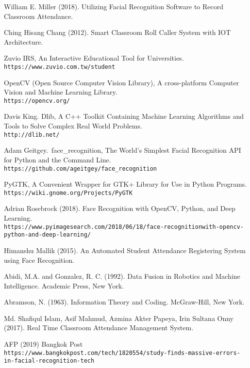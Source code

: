 \begin{thebibliography}{10}

  William E. Miller (2018).
  Utilizing Facial Recognition Software to Record Classroom Attendance.

  Ching Hisang Chang (2012).
  Smart Classroom Roll Caller System with IOT Architecture.

  Zuvio IRS,
  An Interactive Educational Tool for Universities.
  \\\texttt{https://www.zuvio.com.tw/student}

  OpenCV (Open Source Computer Vision Library),
  A cross-platform Computer Vision and Machine Learning Library.
  \\\texttt{https://opencv.org/}

  Davis King.
  Dlib,
  A C++ Toolkit Containing Machine Learning Algorithms and Tools to Solve Complex Real World Problems.
  \\\texttt{http://dlib.net/}

  Adam Geitgey.\
  face\_recognition,
  The World's Simplest Facial Recognition API for Python and the Command Line.
  \\\texttt{https://github.com/ageitgey/face\_recognition}

  PyGTK,
  A Convenient Wrapper for GTK+ Library for Use in Python Programs.
  \\\texttt{https://wiki.gnome.org/Projects/PyGTK}

  Adrian Rosebrock (2018).
  Face Recognition with OpenCV, Python, and Deep Learning.
  \\\texttt{https://www.pyimagesearch.com/2018/06/18/face-recognition\-with-opencv-python-and-deep-learning/}

  Himanshu Mallik (2015).
  An Automated Student Attendance Registering System using Face Recognition.

  Abidi, M.A. and Gonzalez, R. C. (1992).
  Data Fusion in Robotics and Machine Intelligence.
  Academic Press, New York.

  Abramson, N. (1963).
  Information Theory and Coding.
  McGraw-Hill, New York.

  Md. Shafiqul Islam, Asif Mahmud, Azmina Akter Papeya, Irin Sultana Onny (2017).
  Real Time Classroom Attendance Management System.

  AFP (2019)
  Bangkok Post
  \\\texttt{https://www.bangkokpost.com/tech/1820554/study-finds-massive-errors-in-facial-recognition-tech}

\end{thebibliography}
